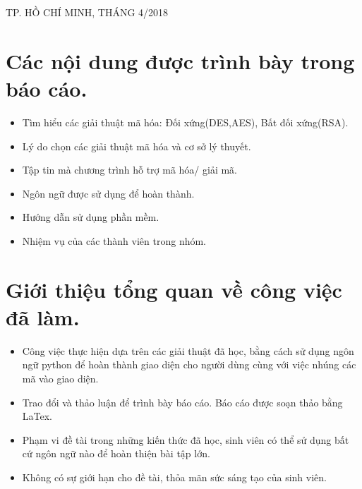 \documentclass[a4paper]{article}
\begin{document}
\begin{titlepage}
\begin{center}
{\footnotesize TP. HỒ CHÍ MINH, THÁNG 4/2018}
\end{center}
\end{titlepage}



\newpage
\tableofcontents
\newpage
\section{Các nội dung được trình bày trong báo cáo.}
\begin{itemize}
	\item
	Tìm hiểu các giải thuật mã hóa: Đối xứng(DES,AES), Bất đối xứng(RSA).
	\item
	Lý do chọn các giải thuật mã hóa và cơ sở lý thuyết.
	\item
	Tập tin mà chương trình  hỗ trợ mã hóa/ giải mã.
	\item
	Ngôn ngữ được sử dụng để hoàn thành.
	\item
	Hướng dẫn sử dụng phần mềm.
	\item
	Nhiệm vụ của các thành viên trong nhóm.
\end{itemize}
\section{Giới thiệu tổng quan về công việc đã làm.}
\begin{itemize}
	\item
	Công việc thực hiện dựa trên các giải thuật đã học, bằng cách sử dụng ngôn ngữ python để hoàn thành giao diện cho người dùng cùng với việc nhúng các mã vào giao diện.
	\item
	 Trao đổi và thảo luận để trình bày báo cáo. Báo cáo được soạn thảo bằng LaTex.
	\item
	Phạm vi đề tài trong những kiến thức đã học, sinh viên có thể sử dụng bất cứ ngôn ngữ nào để hoàn thiện bài tập lớn.
	\item
	Không có sự giới hạn cho đề tài, thỏa mãn sức sáng tạo của sinh viên.
\end{itemize}
\end{document}
